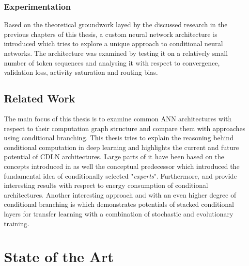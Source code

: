 \subsection{Experimentation}

Based on the theoretical groundwork layed by the discussed research in the previous chapters of this thesis, a custom neural network architecture is introduced which tries to explore a unique approach to conditional neural networks. The architecture was examined by testing it on a relatively small number of token sequences and analysing it with respect to convergence, validation loss, activity saturation and routing bias.

\clearpage

\section{Related Work}

The main focus of this thesis is to examine common \acf{ANN}
architectures with respect to their computation graph structure 
and compare them with approaches using conditional branching.
This thesis tries to explain the reasoning behind conditional computation
in deep learning and highlights the current and future potential of \acf{CDLN} architectures.
Large parts of it have been based on the concepts introduced in  \cite{14_sparsely-gated-experts_2017} as well the conceptual predecessor
 \cite{24_MoE-eigen2014} which introduced the fundamental idea of conditionally selected "\textit{experts}".
Furthermore,  \cite{11_efficient-CDL_2017} and  \cite{8_CDL-4-efficient_2015}
provide interesting results with respect to energy consumption
of conditional architectures.
Another interesting approach and with an even higher degree of conditional
branching is  \cite{27_path-net-evolution} which
demonstrates potentials of stacked conditional layers for transfer learning with a combination of stochastic and evolutionary training.


\clearpage



\chapter{State of the Art}\label{chap_state-of-the-art}
 
